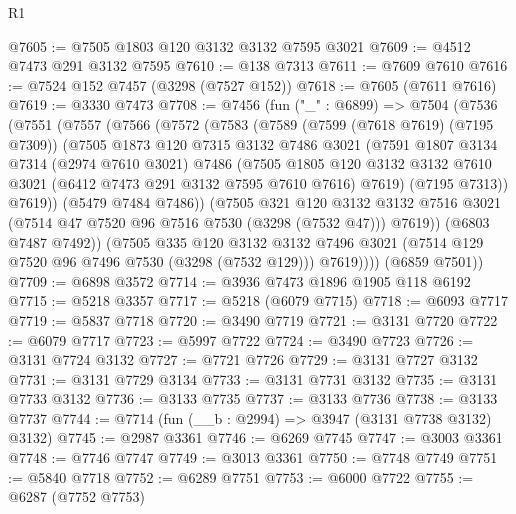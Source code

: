 \begin{lexlean}{R1}
\begin{coremodule}
@7605 := @7505 @1803 @120 @3132 @3132 @7595 @3021
@7609 := @4512 @7473 @291 @3132 @7595
@7610 := @138 @7313
@7611 := @7609 @7610
@7616 := @7524 @152 @7457 (@3298 (@7527 @152))
@7618 := @7605 (@7611 @7616)
@7619 := @3330 @7473
@7708 := @7456
    (fun ("_" : @6899) =>
    @7504
      (@7536
        (@7551
          (@7557
            (@7566
              (@7572
                (@7583
                  (@7589
                    (@7599 (@7618 @7619) (@7195 @7309))
                    (@7505
                      @1873
                      @120
                      @7315
                      @3132
                      @7486
                      @3021
                      (@7591
                        @1807
                        @3134
                        @7314
                        (@2974 @7610 @3021)
                        @7486
                        (@7505
                          @1805
                          @120
                          @3132
                          @3132
                          @7610
                          @3021
                          (@6412 @7473 @291 @3132 @7595 @7610 @7616)
                          @7619)
                        (@7195 @7313))
                      @7619))
                  (@5479 @7484 @7486))
                (@7505
                  @321
                  @120
                  @3132
                  @3132
                  @7516
                  @3021
                  (@7514 @47 @7520 @96 @7516 @7530 (@3298 (@7532 @47)))
                  @7619))
              (@6803 @7487 @7492))
            (@7505
              @335
              @120
              @3132
              @3132
              @7496
              @3021
              (@7514 @129 @7520 @96 @7496 @7530 (@3298 (@7532 @129)))
              @7619))))
      (@6859 @7501))
@7709 := @6898 @3572
@7714 := @3936 @7473 @1896 @1905 @118 @6192
@7715 := @5218 @3357
@7717 := @5218 (@6079 @7715)
@7718 := @6093 @7717
@7719 := @5837 @7718
@7720 := @3490 @7719
@7721 := @3131 @7720
@7722 := @6079 @7717
@7723 := @5997 @7722
@7724 := @3490 @7723
@7726 := @3131 @7724 @3132
@7727 := @7721 @7726
@7729 := @3131 @7727 @3132
@7731 := @3131 @7729 @3134
@7733 := @3131 @7731 @3132
@7735 := @3131 @7733 @3132
@7736 := @3133 @7735
@7737 := @3133 @7736
@7738 := @3133 @7737
@7744 := @7714 (fun (__b : @2994) => @3947 (@3131 @7738 @3132) @3132)
@7745 := @2987 @3361
@7746 := @6269 @7745
@7747 := @3003 @3361
@7748 := @7746 @7747
@7749 := @3013 @3361
@7750 := @7748 @7749
@7751 := @5840 @7718
@7752 := @6289 @7751
@7753 := @6000 @7722
@7755 := @6287 (@7752 @7753)

\end{coremodule}
\end{lexlean}
